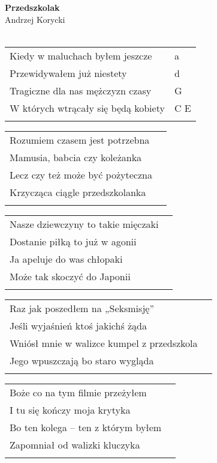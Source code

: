 \documentclass[a5paper]{article}
\begin{document}


\noindent
\fontsize{12pt}{15pt}\selectfont
\textbf{Przedszkolak} \\
\fontsize{8pt}{10pt}\selectfont
Andrzej Korycki \\ \\
\fontsize{10pt}{12pt}\selectfont
{}
\begin{tabular}{@{}p{7.50cm}p{3cm}@{}}
\noindent
Kiedy w maluchach byłem jeszcze & a \\
Przewidywałem już niestety & d \\
Tragiczne dla nas mężczyzn czasy & G \\
W których wtrącały się będą kobiety & C E \\ \\
\end{tabular}

\noindent
\begin{tabular}{@{}p{7.50cm}p{3cm}@{}}
Rozumiem czasem jest potrzebna \\
Mamusia, babcia czy koleżanka \\
Lecz czy też może być pożyteczna \\
Krzycząca ciągle przedszkolanka \\ \\
\end{tabular}

\noindent
\begin{tabular}{@{}p{7.50cm}p{3cm}@{}}
Nasze dziewczyny to takie mięczaki \\
Dostanie piłką to już w agonii \\
Ja apeluje do was chłopaki \\
Może tak skoczyć do Japonii \\ \\
\end{tabular}

\noindent
\begin{tabular}{@{}p{7.50cm}p{3cm}@{}}
Raz jak poszedłem na „Seksmisję” \\
Jeśli wyjaśnień ktoś jakichś żąda \\
Wniósł mnie w walizce kumpel z przedszkola \\
Jego wpuszczają bo staro wygląda \\ \\
\end{tabular}

\noindent
\begin{tabular}{@{}p{7.50cm}p{3cm}@{}}
Boże co na tym filmie przeżyłem \\
I tu się kończy moja krytyka \\
Bo ten kolega – ten z którym byłem \\
Zapomniał od walizki kluczyka \\ \\
\end{tabular}
\end{document}

